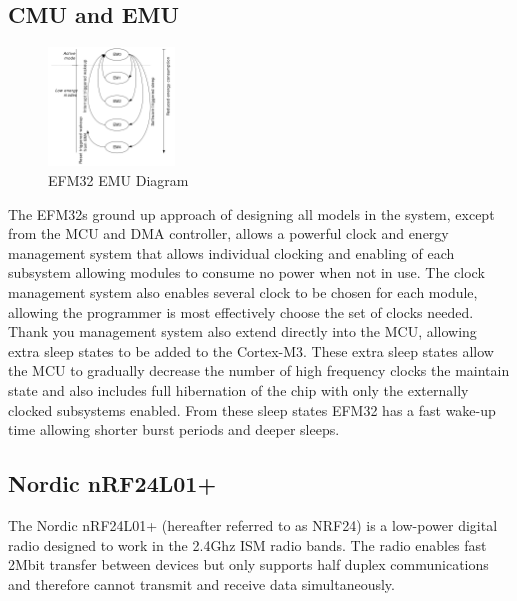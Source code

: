 \subsection{\acf{CMU} and \acf{EMU}}

\begin{figure}
  \vspace{-10pt}
  \begin{center}
    \includegraphics[width=0.3\textwidth, keepaspectratio=true]{images/efm32_sleep_states.png}
  \end{center}
  \caption[EFM32 \ac{EMU} Diagram]{EFM32 \ac{EMU} Diagram \cite{EFM32Ref}}
  \vspace{-10pt}
\end{figure}

The EFM32s ground up approach of designing all models in the system, except from the \ac{MCU} and \ac{DMA} controller,
allows a powerful clock and energy management system that allows individual clocking and enabling
of each subsystem allowing modules to consume no power when not in use. The clock management
system also enables several clock to be chosen for each module, allowing the programmer is most
effectively choose the set of clocks needed. Thank you management system also extend directly into
the \ac{MCU}, allowing extra sleep states to be added to the Cortex-M3. These extra sleep states allow
the \ac{MCU} to gradually decrease the number of high frequency clocks the maintain state and
also includes full hibernation of the chip with only the externally clocked subsystems
enabled. From these sleep states EFM32 has a fast wake-up time allowing shorter burst
periods and deeper sleeps.

\subsection{Nordic nRF24L01+}
The Nordic nRF24L01+ (hereafter referred to as NRF24) is a low-power digital radio
designed to work in the 2.4Ghz ISM radio bands. The radio enables fast 2Mbit transfer
between devices but only supports half duplex communications and therefore cannot transmit and
receive data simultaneously.

